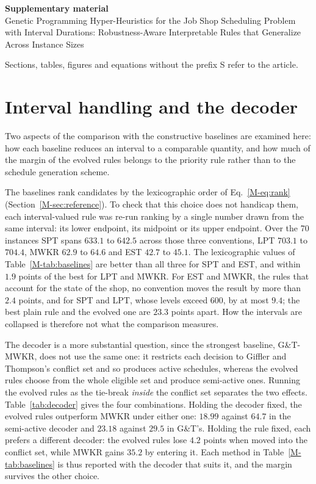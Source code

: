 \documentclass[11pt]{article}
\begin{document}
\begin{center}
{\large\bfseries Supplementary material}\\[4pt]
Genetic Programming Hyper-Heuristics for the Job Shop Scheduling Problem
with Interval Durations: Robustness-Aware Interpretable Rules that
Generalize Across Instance Sizes
\end{center}

\noindent Sections, tables, figures and equations without the prefix S
refer to the article.

\section{Interval handling and the decoder}
\label{sec:decoder}

Two aspects of the comparison with the constructive baselines are
examined here: how each baseline reduces an interval to a comparable
quantity, and how much of the margin of the evolved rules belongs to
the priority rule rather than to the schedule generation scheme.

The baselines rank candidates by the lexicographic order of
Eq.~\eqref{M-eq:rank} (Section~\ref{M-sec:reference}). To check that this
choice does not handicap them, each interval-valued rule was re-run
ranking by a single number drawn from the same interval: its lower
endpoint, its midpoint or its upper endpoint. Over the 70 instances
SPT spans $633.1$ to $642.5$ across those three conventions, LPT
$703.1$ to $704.4$, MWKR $62.9$ to $64.6$ and EST $42.7$ to $45.1$. The
lexicographic values of Table~\ref{M-tab:baselines} are better than all
three for SPT and EST, and within $1.9$ points of the best for LPT and
MWKR. For EST and MWKR, the rules that account for the state of the
shop, no convention moves the result by more than $2.4$ points, and for
SPT and LPT, whose levels exceed 600, by at most $9.4$; the best plain
rule and the evolved one are $23.3$ points apart. How the intervals are
collapsed is therefore not what the comparison measures.

The decoder is a more substantial question, since the strongest
baseline, G\&T-MWKR, does not use the same one: it restricts each
decision to Giffler and Thompson's conflict set and so produces active
schedules, whereas the evolved rules choose from the whole eligible set
and produce semi-active ones. Running the evolved rules as the
tie-break \emph{inside} the conflict set separates the two effects.
Table~\ref{tab:decoder} gives the four combinations. Holding the
decoder fixed, the evolved rules outperform MWKR under either one: $18.99$
against $64.7$ in the semi-active decoder and $23.18$ against $29.5$
in G\&T's. Holding the rule fixed, each prefers a different decoder:
the evolved rules lose $4.2$ points when moved into the conflict set,
while MWKR gains $35.2$ by entering it. Each method in
Table~\ref{M-tab:baselines} is thus reported with the decoder that suits
it, and the margin survives the other choice.
\end{document}
